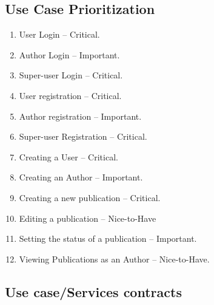 \documentclass[hidelinks,a4paper,12pt]{article}
\begin{document}
	\subsection{ Use Case Prioritization}
	
	
	\begin{enumerate}
		
		\item  User Login -- Critical.
		
		\item  Author Login -- Important.
		
		\item  Super-user Login -- Critical.
		
		\item  User registration -- Critical.
		
		\item  Author registration -- Important.
		
		\item  Super-user Registration -- Critical.
		
		\item  Creating a User -- Critical.
		
		\item  Creating an Author -- Important.
		
		\item  Creating a new publication -- Critical.
		
		\item  Editing a publication -- Nice-to-Have
		
		\item  Setting the status of a publication -- Important.
		
		\item  Viewing Publications as an Author -- Nice-to-Have.
	\end{enumerate}
	
	\noindent 
	
	
	\subsection{ Use case/Services contracts}
	
\end{document}
